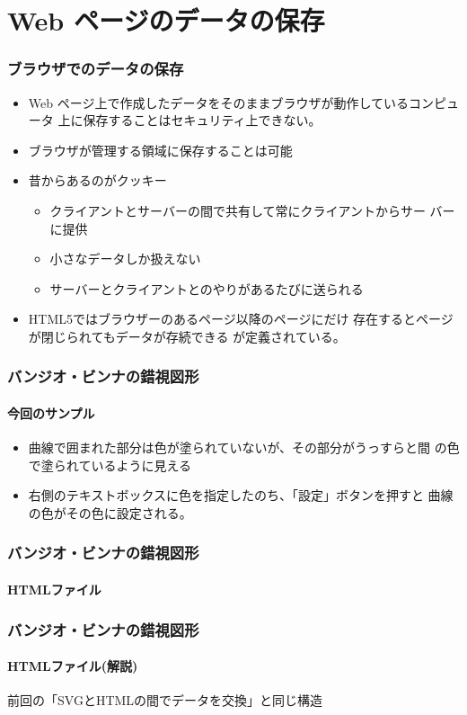 

\frame{\maketitle}
\section{Web ページのデータの保存}
\begin{frame}[containsverbatim]
\frametitle{ブラウザでのデータの保存}
\begin{itemize}
 \item Web ページ上で作成したデータをそのままブラウザが動作しているコンピュータ
上に保存することはセキュリティ上できない。
 \item ブラウザが管理する領域に保存することは可能
 \item 昔からあるのがクッキー
			 \begin{itemize}
				\item クライアントとサーバーの間で共有して常にクライアントからサー
							バーに提供
				\item 小さなデータしか扱えない
				\item サーバーとクライアントとのやりがあるたびに送られる
			 \end{itemize}
 \item HTML5ではブラウザーのあるページ以降のページにだけ
存在するとページが閉じられてもデータが存続できる
が定義されている。
\end{itemize}
\end{frame}
\begin{frame}[containsverbatim]
 \frametitle{バンジオ・ビンナの錯視図形}
 \framesubtitle{今回のサンプル}
\begin{itemize}
 \item 曲線で囲まれた部分は色が塗られていないが、その部分がうっすらと間
       の色で塗られているように見える
 \item 右側のテキストボックスに色を指定したのち、「設定」ボタンを押すと
       曲線の色がその色に設定される。
\end{itemize}
\end{frame}
\begin{frame}[containsverbatim]
 \frametitle{バンジオ・ビンナの錯視図形}
 \framesubtitle{HTMLファイル}
\end{frame}
\begin{frame}[containsverbatim]
 \frametitle{バンジオ・ビンナの錯視図形}
 \framesubtitle{HTMLファイル(解説)}
 前回の「SVGとHTMLの間でデータを交換」と同じ構造
\end{frame}
